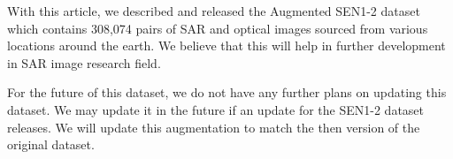 With this article, we described and released the Augmented SEN1-2 dataset which contains 308,074 pairs of SAR and optical images sourced from various locations around the earth. We believe that this will help in further development in SAR image research field.

For the future of this dataset, we do not have any further plans on updating this dataset. We may update it in the future if an update for the SEN1-2 dataset releases. We will update this augmentation to match the then version of the original dataset.